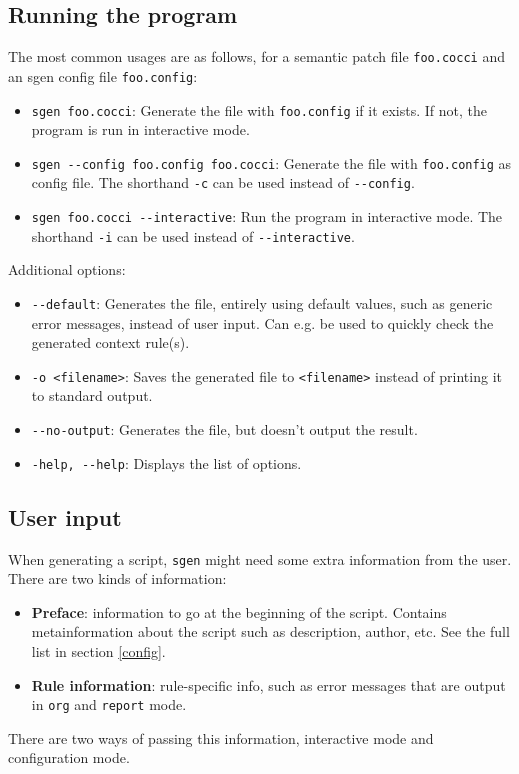 \subsection{Running the program}
The most common usages are as follows, for a semantic patch file \texttt{foo.cocci} and an sgen config file \texttt{foo.config}:
\begin{itemize}
\item \texttt{sgen foo.cocci}: Generate the file with \texttt{foo.config} if it exists. If not, the program is run in interactive mode.
\item \texttt{sgen -{}-config foo.config foo.cocci}: Generate the file with \texttt{foo.config} as config file. The shorthand \texttt{-c} can be used instead of \texttt{-{}-config}.
\item \texttt{sgen foo.cocci -{}-interactive}: Run the program in interactive mode. The shorthand \texttt{-i} can be used instead of \texttt{-{}-interactive}.
\end{itemize}
Additional options:
\begin{itemize}
\item \texttt{-{}-default}: Generates the file, entirely using default values, such as generic error messages, instead of user input. Can e.g. be used to quickly check the generated context rule(s).
\item \texttt{-o <filename>}: Saves the generated file to \texttt{<filename>} instead of printing it to standard output.
\item \texttt{-{}-no-output}: Generates the file, but doesn't output the result.
\item \texttt{-help, -{}-help}: Displays the list of options.
\end{itemize}
\bigskip

\subsection{User input}
When generating a script, \texttt{sgen} might need some extra information from the user. There are two kinds of information:
\begin{itemize}
\item \textbf{Preface}: information to go at the beginning of the script. Contains metainformation about the script such as description, author, etc. See the full list in section \ref{config}.
\item \textbf{Rule information}: rule-specific info, such as error messages that are output in \texttt{org} and \texttt{report} mode.
\end{itemize}
There are two ways of passing this information, interactive mode and configuration mode.
\bigskip

